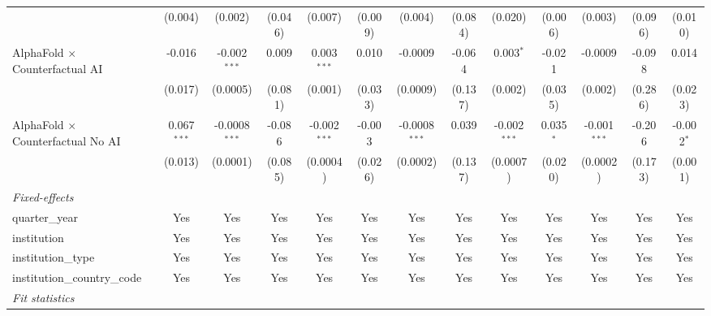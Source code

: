 \begin{tabular}{lcccccccccccc}
                                            & (0.004)       & (0.002)         & (0.046)       & (0.007)        & (0.009)       & (0.004)         & (0.084)     & (0.020)        & (0.006)       & (0.003)        & (0.096)       & (0.010)\\   
   AlphaFold $\times$ Counterfactual AI     & -0.016        & -0.002$^{***}$  & 0.009         & 0.003$^{***}$  & 0.010         & -0.0009         & -0.064      & 0.003$^{*}$    & -0.021        & -0.0009        & -0.098        & 0.014\\   
                                            & (0.017)       & (0.0005)        & (0.081)       & (0.001)        & (0.033)       & (0.0009)        & (0.137)     & (0.002)        & (0.035)       & (0.002)        & (0.286)       & (0.023)\\   
   AlphaFold $\times$ Counterfactual No AI  & 0.067$^{***}$ & -0.0008$^{***}$ & -0.086        & -0.002$^{***}$ & -0.003        & -0.0008$^{***}$ & 0.039       & -0.002$^{***}$ & 0.035$^{*}$   & -0.001$^{***}$ & -0.206        & -0.002$^{*}$\\   
                                            & (0.013)       & (0.0001)        & (0.085)       & (0.0004)       & (0.026)       & (0.0002)        & (0.137)     & (0.0007)       & (0.020)       & (0.0002)       & (0.173)       & (0.001)\\   
   \midrule
   \emph{Fixed-effects}\\
   quarter\_year                            & Yes           & Yes             & Yes           & Yes            & Yes           & Yes             & Yes         & Yes            & Yes           & Yes            & Yes           & Yes\\  
   institution                              & Yes           & Yes             & Yes           & Yes            & Yes           & Yes             & Yes         & Yes            & Yes           & Yes            & Yes           & Yes\\  
   institution\_type                        & Yes           & Yes             & Yes           & Yes            & Yes           & Yes             & Yes         & Yes            & Yes           & Yes            & Yes           & Yes\\  
   institution\_country\_code               & Yes           & Yes             & Yes           & Yes            & Yes           & Yes             & Yes         & Yes            & Yes           & Yes            & Yes           & Yes\\  
   \midrule
   \emph{Fit statistics}\\

\end{tabular}
